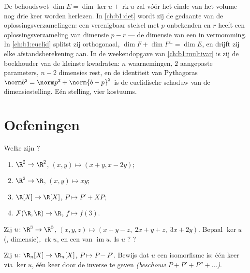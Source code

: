 \begin{remark}
\label{rem:b1:linmaps:perspectives}
De behoudswet $\dim E = \dim\ker u + \operatorname{rk} u$ zal vóór
het einde van het volume nog drie keer worden herlezen. In
\cref{ch:b1:det} wordt zij de gedaante van de
oplossingsverzamelingen: een verenigbaar stelsel met $p$
onbekenden en  $r$ heeft een oplossingsverzameling van
dimensie $p - r$ --- de dimensie van een  in vermomming. In
\cref{ch:b1:euclid} splitst zij orthogonaal, $\dim F + \dim
F^\perp = \dim E$, en drijft zij elke afstandsberekening aan. In
de weekendopgave van \cref{ch:b1:multivar} is zij de boekhouder
van de kleinste kwadraten: $n$ waarnemingen, $2$ aangepaste
parameters, $n - 2$ dimensies rest, en de identiteit van Pythagoras
$\norm b^2 = \norm p^2 + \norm{b - p}^2$ is de euclidische schaduw
van de dimensiestelling. Eén stelling, vier kostuums.
\end{remark}

\section{Oefeningen}

\begin{exercise}[$\star$]\label{exo:b1:linmaps:1}
Welke  zijn ?
\begin{enumerate}
  \item $\R^2 \to \R^2$, $(x, y) \mapsto (x + y, x - 2y)$;
  \item $\R^2 \to \R$, $(x, y) \mapsto xy$;
  \item $\R[X] \to \R[X]$, $P \mapsto P' + XP$;
  \item $\mathcal{F}(\R,\R) \to \R$, $f \mapsto f(3)$.
\end{enumerate}
\end{exercise}

\begin{exercise}[$\star$]\label{exo:b1:linmaps:2}
Zij $u \colon \R^3 \to \R^3$, $(x,y,z) \mapsto (x + y - z,\; 2x + y
+ z,\; 3x + 2y)$. Bepaal $\ker u$ (, dimensie),
$\operatorname{rk} u$, en een  van $\operatorname{im} u$. Is
$u$ ? ?
\end{exercise}

\begin{exercise}[$\star$]\label{exo:b1:linmaps:3}
Zij $u \colon \R_n[X] \to \R_n[X]$, $P \mapsto P - P'$. Bewijs dat
$u$ een isomorfisme is: één keer via $\ker u$, één keer door de
inverse te geven \emph{(beschouw $P + P' + P'' + \dots$)}.
\end{exercise}

